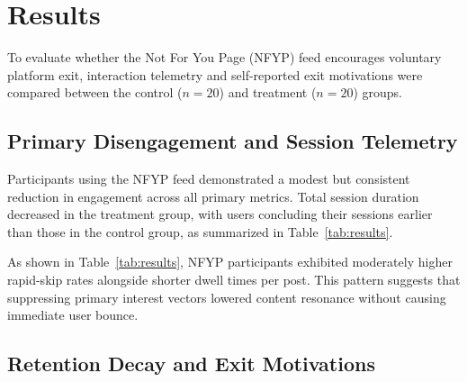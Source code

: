 \documentclass[10pt,leqno,twoside]{article}
\begin{document}
\section{Results}

To evaluate whether the Not For You Page (NFYP) feed encourages voluntary platform exit, interaction telemetry and self-reported exit motivations were compared between the control ($n = 20$) and treatment ($n = 20$) groups.

\subsection{Primary Disengagement and Session Telemetry}

Participants using the NFYP feed demonstrated a modest but consistent reduction in engagement across all primary metrics. Total session duration decreased in the treatment group, with users concluding their sessions earlier than those in the control group, as summarized in Table~\ref{tab:results}.

\begin{table}[ht]
	\centering
	\caption{\label{tab:results}Primary interaction metrics across experimental conditions ($N=40$).}
\end{table}

As shown in Table~\ref{tab:results}, NFYP participants exhibited moderately higher rapid-skip rates alongside shorter dwell times per post. This pattern suggests that suppressing primary interest vectors lowered content resonance without causing immediate user bounce.

\subsection{Retention Decay and Exit Motivations}
\end{document}
